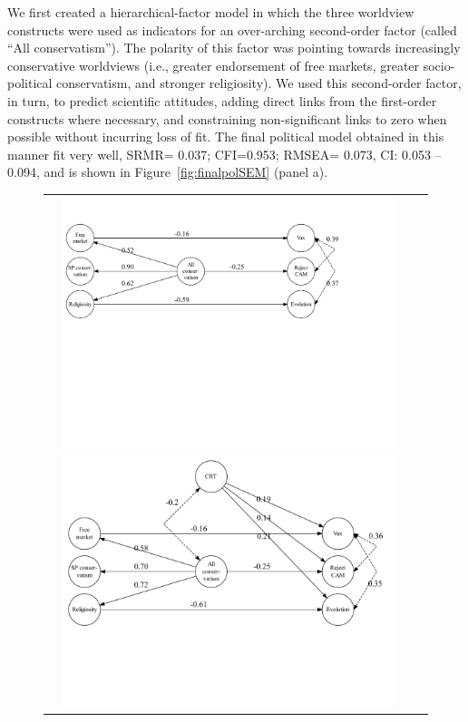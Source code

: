 \documentclass[fignum,man]{apa}\usepackage[]{graphicx}\usepackage[]{color}
\newcommand{\helv}[1]{{\Huge\fontfamily{phv}\selectfont{#1}}}
\begin{document}
We first created a hierarchical-factor model in which the three worldview constructs 
were used as indicators for an over-arching second-order factor (called ``All conservatism''). 
The polarity of this factor was pointing towards increasingly conservative worldviews (i.e., greater
endorsement of free markets, greater socio-political conservatism, and stronger religiosity). 
We used this second-order factor, in turn, to predict scientific 
attitudes, adding direct links from the first-order constructs where necessary,
and constraining non-significant links to zero when possible without
incurring loss of fit.
The final political model obtained in this manner fit very well,
SRMR=
0.037; 
CFI=0.953; RMSEA= 
0.073, CI:
0.053 -- 
0.094,
 and is shown in Figure~\ref{fig:finalpolSEM} (panel a).
\begin{figure}[tp] %
\begin{center}
\begin{tabular}{rcrc}
\raisebox{2.8in}{\bf \helv{a}} & \includegraphics[width=6in]{finalpolSEM.pdf} \\
\raisebox{2.8in}{\bf \helv{b}} & \includegraphics[width=6in]{superSEM.pdf}

\end{tabular}
\end{center}
\end{figure}
\end{document}
